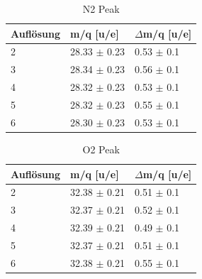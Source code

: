 \documentclass[10pt,a4paper]{article}
\begin{document}
\begin{table}[k]
	\centering
	\caption{N2 Peak}
	\label{t1}
	\begin{tabular}{|l|l|l|}
		\hline
		Auflösung & m/q {[}u/e{]} & $\Delta$m/q {[}u/e{]} \\ \hline
		2         & 28.33 $\pm$ 0.23        & 0.53 $\pm$ 0.1                 \\ \hline
		3         & 28.34 $\pm$ 0.23        & 0.56 $\pm$ 0.1                 \\ \hline
		4         & 28.32 $\pm$ 0.23        & 0.53 $\pm$ 0.1                 \\ \hline
		5         & 28.32 $\pm$ 0.23        & 0.55 $\pm$ 0.1                 \\ \hline
		6         & 28.30 $\pm$ 0.23        & 0.53 $\pm$ 0.1                 \\ \hline
	\end{tabular}
\end{table}
\begin{table}[k]
	\centering
	\caption{O2 Peak}
	\label{t2}
	\begin{tabular}{|l|l|l|}
		\hline
		Auflösung & m/q {[}u/e{]} & $\Delta$m/q {[}u/e{]} \\ \hline
		2         & 32.38 $\pm$ 0.21         & 0.51 $\pm$ 0.1                 \\ \hline
		3         & 32.37 $\pm$ 0.21         & 0.52 $\pm$ 0.1                 \\ \hline
		4         & 32.39 $\pm$ 0.21         & 0.49 $\pm$ 0.1                 \\ \hline
		5         & 32.37 $\pm$ 0.21         & 0.51 $\pm$ 0.1                 \\ \hline
		6         & 32.38 $\pm$ 0.21         & 0.55 $\pm$ 0.1                 \\ \hline
	\end{tabular}
\end{table}
\end{document}
